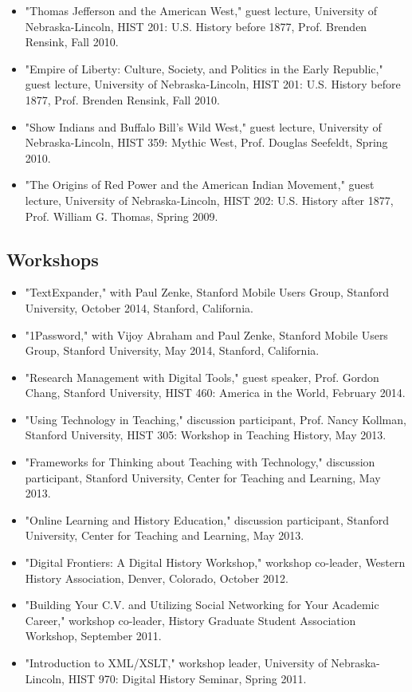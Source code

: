 \documentclass[10pt]{article}
\begin{document}
\begin{itemize}
  \item "Thomas Jefferson and the American West," guest lecture, University of Nebraska-Lincoln, HIST 201: U.S. History before 1877, Prof. Brenden Rensink, Fall 2010.
  \item "Empire of Liberty: Culture, Society, and Politics in the Early Republic," guest lecture, University of Nebraska-Lincoln, HIST 201: U.S. History before 1877, Prof. Brenden Rensink, Fall 2010.
  \item "Show Indians and Buffalo Bill's Wild West," guest lecture, University of Nebraska-Lincoln, HIST 359: Mythic West, Prof. Douglas Seefeldt, Spring 2010.
  \item "The Origins of Red Power and the American Indian Movement," guest lecture, University of Nebraska-Lincoln, HIST 202: U.S. History after 1877, Prof. William G. Thomas, Spring 2009.
\end{itemize}

\subsection*{Workshops}

\begin{itemize}
  \item "TextExpander," with Paul Zenke, Stanford Mobile Users Group, Stanford University, October 2014, Stanford, California.
  \item "1Password," with Vijoy Abraham and Paul Zenke, Stanford Mobile Users Group, Stanford University, May 2014, Stanford, California.
  \item "Research Management with Digital Tools," guest speaker, Prof. Gordon Chang, Stanford University, HIST 460: America in the World, February 2014.
  \item "Using Technology in Teaching," discussion participant, Prof. Nancy Kollman, Stanford University, HIST 305: Workshop in Teaching History, May 2013.
  \item "Frameworks for Thinking about Teaching with Technology," discussion participant, Stanford University, Center for Teaching and Learning, May 2013.
  \item "Online Learning and History Education," discussion participant, Stanford University, Center for Teaching and Learning, May 2013.
  \item "Digital Frontiers: A Digital History Workshop," workshop co-leader, Western History Association, Denver, Colorado, October 2012.
  \item "Building Your C.V. and Utilizing Social Networking for Your Academic Career," workshop co-leader, History Graduate Student Association Workshop, September 2011.
  \item "Introduction to XML/XSLT," workshop leader, University of Nebraska-Lincoln, HIST 970: Digital History Seminar, Spring 2011.
\end{itemize}
\end{document}
